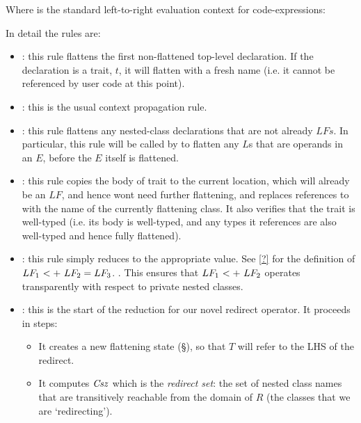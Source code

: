 Where  is the standard left-to-right evaluation context for code-expressions:\\
\indent\parbox{\dimexpr\textwidth-\parindent}{\begin{grammar}
\end{grammar}}

\noindent In detail the rules are:
\begin{itemize}
	\item {}: this rule flattens the first non-flattened top-level declaration. If the declaration is a trait, $t$, it will flatten with a fresh name (i.e. it cannot be referenced by user code at this point).
	\item {}: this is the usual context propagation rule.
	\item {}: this rule flattens any nested-class declarations that are not already $LFs$. In particular, this rule will be called by  to flatten any $L$s that are operands in an $E$, before the $E$ itself is flattened.
	\item {}: this rule copies the body of trait to the current location, which will already be an $LF$, and hence wont need further flattening, and replaces references to \This with the name of the currently flattening class. It also verifies that the trait is well-typed (i.e. its body is well-typed, and any types it references are also well-typed and hence fully flattened).
	\item {}: this rule simply reduces to the appropriate value. See \autoref{?} for the definition of $\summ{LF_1}{LF_2}=LF_3$. . This ensures that $\summ{LF_1}{LF_2}$ operates transparently with respect to private nested classes.  
	\item {}: this is the start of the reduction for our novel redirect operator. It proceeds in steps:
	\begin{itemize}
		\item It creates a new flattening state (\S), so that $T$ will refer to the LHS of the redirect.
		\item It computes $\mathit{Csz}$ which is the \emph{redirect set}: the set of nested class names that are transitively reachable from the domain of $R$ (the classes that we are `redirecting').

\end{itemize}
\end{itemize}
